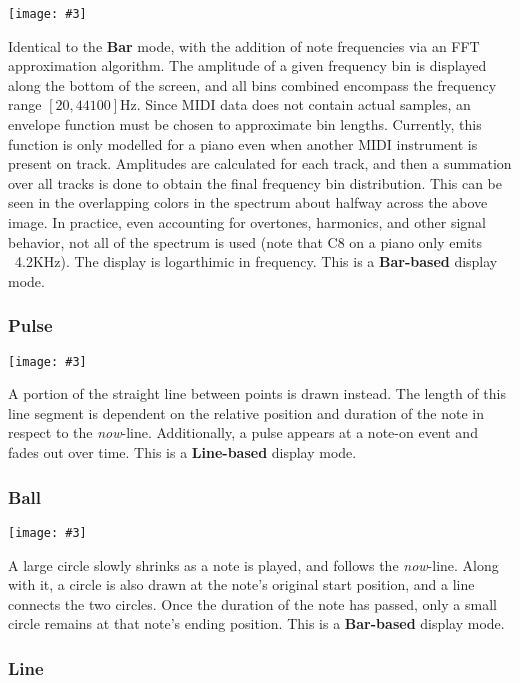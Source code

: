 \documentclass[english]{article}
\makeatletter
\newenvironment{restoretext}%
    {\@parboxrestore%
     \begin{adjustwidth}{}{\leftmargin}%
    }{\end{adjustwidth}
     }
\def\rcbegin{\begin{restoretext}\centering}
\def\rcend{\end{restoretext}}
\newcommand{\rcgnc}[3][]{
  \rcbegin
    \texttt{[image: \#3]}
  \rcend
  \vspace{1em}
}
\makeatother
\begin{document}
\rcgnc{0.86}{image/fft.png}

Identical to the \textbf{Bar} mode, with the addition of note frequencies via 
an FFT approximation algorithm. The amplitude of a given frequency bin is
displayed along the bottom of the screen, and all bins combined encompass the
frequency range $[20, 44100]$Hz.
Since MIDI data does not contain actual samples, an envelope function
must be chosen to approximate bin lengths. Currently, this function
is only modelled for a piano even when another MIDI instrument is present on track. Amplitudes are calculated
for each track, and then a summation over all tracks is done to obtain the final frequency bin distribution.
This can be seen in the overlapping colors in the spectrum about halfway across the above image. In practice, 
even accounting for overtones, harmonics, and other signal behavior, not all of the spectrum is used 
(note that C8 on a piano only emits ~4.2KHz). The display is logarthimic in frequency. 
This is a \textbf{Bar-based} display mode.

\newpage
\subsubsection{Pulse}

\rcgnc{0.86}{image/pulse.png}

A portion of the straight line between points is drawn instead. The length of this
line segment is dependent on the relative position and duration of the note in respect to the \textit{now}-line.
Additionally, a pulse appears at a note-on event and fades out over time.
This is a \textbf{Line-based} display mode.


\subsubsection{Ball}

\rcgnc{0.86}{image/ball.png}

A large circle slowly shrinks as a note is played, and follows the \textit{now}-line. Along with it, a 
circle is also drawn at the note's original start position, and a line connects the two circles. Once the duration
of the note has passed, only a small circle remains at that note's ending position.
This is a \textbf{Bar-based} display mode.

\newpage

\subsubsection{Line}
\end{document}
